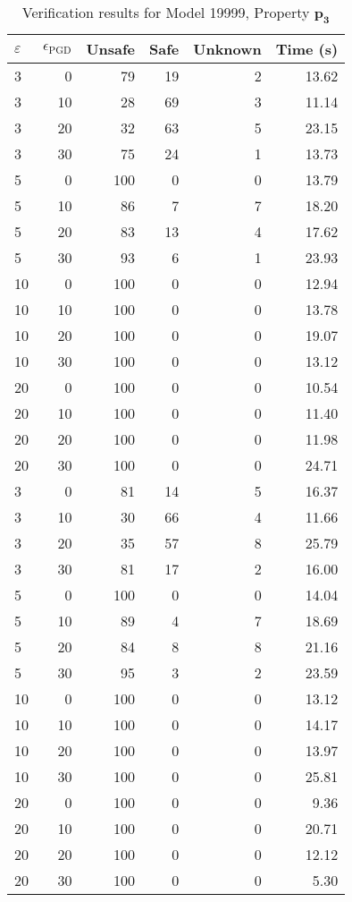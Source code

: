 \begin{table}[htbp]
\centering
\caption{Verification results for Model 19999, Property $\mathbf{p_{3}}$}
\label{tab:model19999_r3_part8}
\begin{tabular}{lrrrrr}
\toprule
$\varepsilon$ & $\epsilon_{\scriptscriptstyle\mathrm{PGD}}$ & Unsafe & Safe & Unknown & Time (s) \\
\midrule
3 & 0 & 79 & 19 & 2 & 13.62 \\
3 & 10 & 28 & 69 & 3 & 11.14 \\
3 & 20 & 32 & 63 & 5 & 23.15 \\
3 & 30 & 75 & 24 & 1 & 13.73 \\
5 & 0 & 100 & 0 & 0 & 13.79 \\
5 & 10 & 86 & 7 & 7 & 18.20 \\
5 & 20 & 83 & 13 & 4 & 17.62 \\
5 & 30 & 93 & 6 & 1 & 23.93 \\
10 & 0 & 100 & 0 & 0 & 12.94 \\
10 & 10 & 100 & 0 & 0 & 13.78 \\
10 & 20 & 100 & 0 & 0 & 19.07 \\
10 & 30 & 100 & 0 & 0 & 13.12 \\
20 & 0 & 100 & 0 & 0 & 10.54 \\
20 & 10 & 100 & 0 & 0 & 11.40 \\
20 & 20 & 100 & 0 & 0 & 11.98 \\
20 & 30 & 100 & 0 & 0 & 24.71 \\
3 & 0 & 81 & 14 & 5 & 16.37 \\
3 & 10 & 30 & 66 & 4 & 11.66 \\
3 & 20 & 35 & 57 & 8 & 25.79 \\
3 & 30 & 81 & 17 & 2 & 16.00 \\
5 & 0 & 100 & 0 & 0 & 14.04 \\
5 & 10 & 89 & 4 & 7 & 18.69 \\
5 & 20 & 84 & 8 & 8 & 21.16 \\
5 & 30 & 95 & 3 & 2 & 23.59 \\
10 & 0 & 100 & 0 & 0 & 13.12 \\
10 & 10 & 100 & 0 & 0 & 14.17 \\
10 & 20 & 100 & 0 & 0 & 13.97 \\
10 & 30 & 100 & 0 & 0 & 25.81 \\
20 & 0 & 100 & 0 & 0 & 9.36 \\
20 & 10 & 100 & 0 & 0 & 20.71 \\
20 & 20 & 100 & 0 & 0 & 12.12 \\
20 & 30 & 100 & 0 & 0 & 5.30 \\
\bottomrule
\end{tabular}
\end{table}
